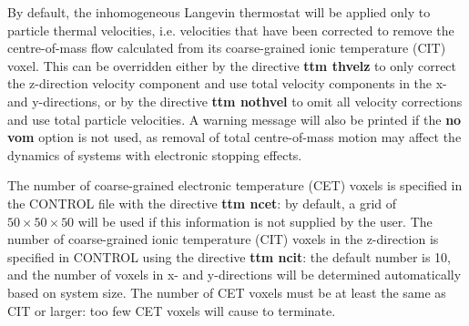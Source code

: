 By default, the inhomogeneous Langevin thermostat will be applied only to
particle thermal velocities, i.e. velocities that have been corrected to
remove the centre-of-mass flow calculated from its coarse-grained ionic
temperature (CIT) voxel. This can be overridden either by the directive
{\bf ttm thvelz} to only correct the z-direction velocity component and use
total velocity components in the x- and y-directions, or by the directive
{\bf ttm nothvel} to omit all velocity corrections and use total particle
velocities. A warning message will also be printed if the {\bf no vom} option
is not used, as removal of total centre-of-mass motion may affect the
dynamics of systems with electronic stopping effects.

The number of coarse-grained electronic temperature (CET) voxels is
specified in the CONTROL file with the directive {\bf ttm ncet}: by default,
a grid of $50 \times 50 \times 50$ will be used if this information is not
supplied by the user. The number of coarse-grained ionic temperature (CIT)
voxels in the z-direction is specified in CONTROL using the directive
{\bf ttm ncit}: the default number is 10, and the number of voxels in x-
and y-directions will be determined automatically based on system size.
The number of CET voxels must be at least the same as CIT or larger:
too few CET voxels will cause \D to terminate.

